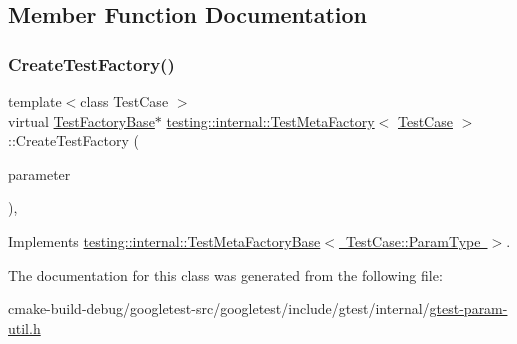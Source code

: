 \subsection{Member Function Documentation}
\mbox{\label{classtesting_1_1internal_1_1TestMetaFactory_ae9f5334c68af309bca8f7ec29d837e38}} 
\subsubsection{\texorpdfstring{CreateTestFactory()}{CreateTestFactory()}}
{\footnotesize\ttfamily template$<$class Test\+Case $>$ \\
virtual \mbox{\hyperlink{classtesting_1_1internal_1_1TestFactoryBase}{Test\+Factory\+Base}}$\ast$ \mbox{\hyperlink{classtesting_1_1internal_1_1TestMetaFactory}{testing\+::internal\+::\+Test\+Meta\+Factory}}$<$ \mbox{\hyperlink{classtesting_1_1TestCase}{Test\+Case}} $>$\+::Create\+Test\+Factory (\begin{DoxyParamCaption}\item[{\mbox{\hyperlink{classtesting_1_1internal_1_1TestMetaFactory_a9c12e442b4389381b948ed669fcf0f84}{Param\+Type}}}]{parameter }\end{DoxyParamCaption})\hspace{0.3cm}{\ttfamily [inline]}, {\ttfamily [virtual]}}



Implements \mbox{\hyperlink{classtesting_1_1internal_1_1TestMetaFactoryBase_a853daab362740bcac55e180128d564ef}{testing\+::internal\+::\+Test\+Meta\+Factory\+Base$<$ Test\+Case\+::\+Param\+Type $>$}}.



The documentation for this class was generated from the following file\+:\begin{DoxyCompactItemize}
\item 
cmake-\/build-\/debug/googletest-\/src/googletest/include/gtest/internal/\mbox{\hyperlink{gtest-param-util_8h}{gtest-\/param-\/util.\+h}}\end{DoxyCompactItemize}
